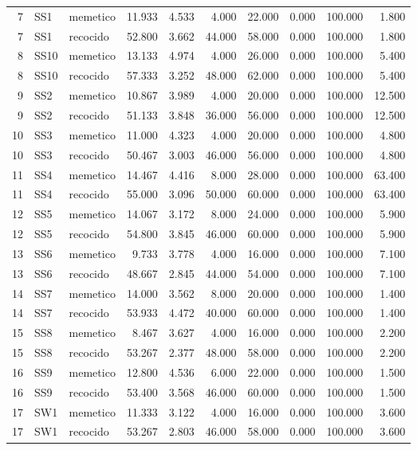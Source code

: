 \documentclass{article}
\begin{document}
\begin{table}[H]
{\begin{tabular}{rllrrrrrrr}
7 & SS1 & memetico & 11.933 & 4.533 & 4.000 & 22.000 & 0.000 & 100.000 & 1.800 \\
7 & SS1 & recocido & 52.800 & 3.662 & 44.000 & 58.000 & 0.000 & 100.000 & 1.800 \\
8 & SS10 & memetico & 13.133 & 4.974 & 4.000 & 26.000 & 0.000 & 100.000 & 5.400 \\
8 & SS10 & recocido & 57.333 & 3.252 & 48.000 & 62.000 & 0.000 & 100.000 & 5.400 \\
9 & SS2 & memetico & 10.867 & 3.989 & 4.000 & 20.000 & 0.000 & 100.000 & 12.500 \\
9 & SS2 & recocido & 51.133 & 3.848 & 36.000 & 56.000 & 0.000 & 100.000 & 12.500 \\
10 & SS3 & memetico & 11.000 & 4.323 & 4.000 & 20.000 & 0.000 & 100.000 & 4.800 \\
10 & SS3 & recocido & 50.467 & 3.003 & 46.000 & 56.000 & 0.000 & 100.000 & 4.800 \\
11 & SS4 & memetico & 14.467 & 4.416 & 8.000 & 28.000 & 0.000 & 100.000 & 63.400 \\
11 & SS4 & recocido & 55.000 & 3.096 & 50.000 & 60.000 & 0.000 & 100.000 & 63.400 \\
12 & SS5 & memetico & 14.067 & 3.172 & 8.000 & 24.000 & 0.000 & 100.000 & 5.900 \\
12 & SS5 & recocido & 54.800 & 3.845 & 46.000 & 60.000 & 0.000 & 100.000 & 5.900 \\
13 & SS6 & memetico & 9.733 & 3.778 & 4.000 & 16.000 & 0.000 & 100.000 & 7.100 \\
13 & SS6 & recocido & 48.667 & 2.845 & 44.000 & 54.000 & 0.000 & 100.000 & 7.100 \\
14 & SS7 & memetico & 14.000 & 3.562 & 8.000 & 20.000 & 0.000 & 100.000 & 1.400 \\
14 & SS7 & recocido & 53.933 & 4.472 & 40.000 & 60.000 & 0.000 & 100.000 & 1.400 \\
15 & SS8 & memetico & 8.467 & 3.627 & 4.000 & 16.000 & 0.000 & 100.000 & 2.200 \\
15 & SS8 & recocido & 53.267 & 2.377 & 48.000 & 58.000 & 0.000 & 100.000 & 2.200 \\
16 & SS9 & memetico & 12.800 & 4.536 & 6.000 & 22.000 & 0.000 & 100.000 & 1.500 \\
16 & SS9 & recocido & 53.400 & 3.568 & 46.000 & 60.000 & 0.000 & 100.000 & 1.500 \\
17 & SW1 & memetico & 11.333 & 3.122 & 4.000 & 16.000 & 0.000 & 100.000 & 3.600 \\
17 & SW1 & recocido & 53.267 & 2.803 & 46.000 & 58.000 & 0.000 & 100.000 & 3.600 \\

\end{tabular}}
\end{table}
\end{document}
